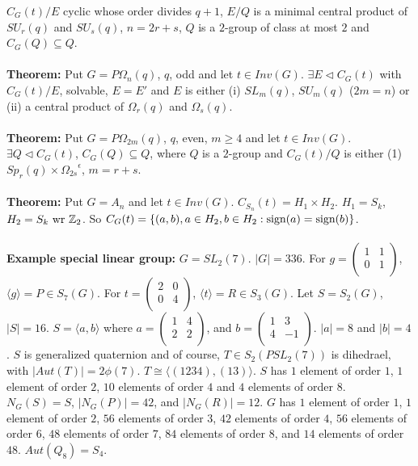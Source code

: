 $C_G(t)/E$ cyclic whose order divides $q+1$, $E/Q$ is a minimal central product of $SU_r(q)$ and $SU_s(q)$, $n =2r+s$, $Q$ is a $2$-group
of class at most $2$ and $C_G(Q) \subseteq Q$.
\\
\\
{\bf Theorem:} Put $G = P\Omega_{n}(q)$, $q$, odd and let $t \in Inv(G)$.  $\exists E \lhd C_G(t)$ with $C_G(t)/E$, solvable,
$E=E'$ and $E$ is either (i) $SL_m(q)$, $SU_m(q)$ ($2m=n$) or (ii) a central product of $\Omega_r(q)$ and $\Omega_s(q)$.
\\
\\
{\bf Theorem:} Put $G = P\Omega_{2m}(q)$, $q$, even, $m \geq 4$ and let $t \in Inv(G)$. $\exists Q \lhd C_G(t)$, $C_G(Q) \subseteq Q$,
where $Q$ is a $2$-group and $C_G(t)/Q$ is either (1) $Sp_r(q) \times {\Omega_{2s}}^{\epsilon}$, $m=r+s$.
\\
\\
{\bf Theorem:} Put $G = A_n$ and let $t \in Inv(G)$. $C_{S_n}(t) = H_1 \times H_2$.  $H_1= S_k$, $H_2= S_k \textnormal{ wr } \mathbb{Z}_2$.
So $C_G(t) = \{ (a, b), a \in H_2, b \in H_2: \textnormal{sign}(a) =  \textnormal{sign}(b) \}$.
\\
\\
{\bf Example special linear group:}
$G=SL_2(7)$. $|G|=336$.  
For $g= \left(
\begin{array}{cc}
1 & 1\\
0 & 1\\
\end{array}
\right)$, $\langle g \rangle = P \in S_7(G)$.
For $t= \left(
\begin{array}{cc}
2 & 0\\
0 & 4\\
\end{array}
\right)$, $\langle t \rangle = R \in S_3(G)$.  Let $S= S_2(G)$, $|S|=16$.
$S = \langle a, b \rangle$ where 
$a= \left(
\begin{array}{cc}
1 & 4\\
2 & 2\\
\end{array}
\right)$, and
$b= \left(
\begin{array}{cc}
1 & 3\\
4 & -1\\
\end{array}
\right)$. $|a|=8$ and $|b|=4$.
$S$ is generalized quaternion and of course, $T \in S_2(PSL_2(7))$ is dihedrael, with
$|Aut(T)| = 2 \phi(7)$. $T \cong \langle (1234), (13) \rangle$.
$S$ has $1$ element of order $1$,
$1$ element of order $2$, $10$ elements of order $4$ and $4$ elements of order $8$.
$N_G(S) = S$,
$|N_G(P)| = 42$, and
$|N_G(R)| = 12$.
$G$ has $1$ element of order $1$,
$1$ element of order $2$,
$56$ elements of order $3$,
$42$ elements of order $4$,
$56$ elements of order $6$,
$48$ elements of order $7$,
$84$ elements of order $8$, and
$14$ elements of order $48$.  $Aut(Q_8) = S_4$.
